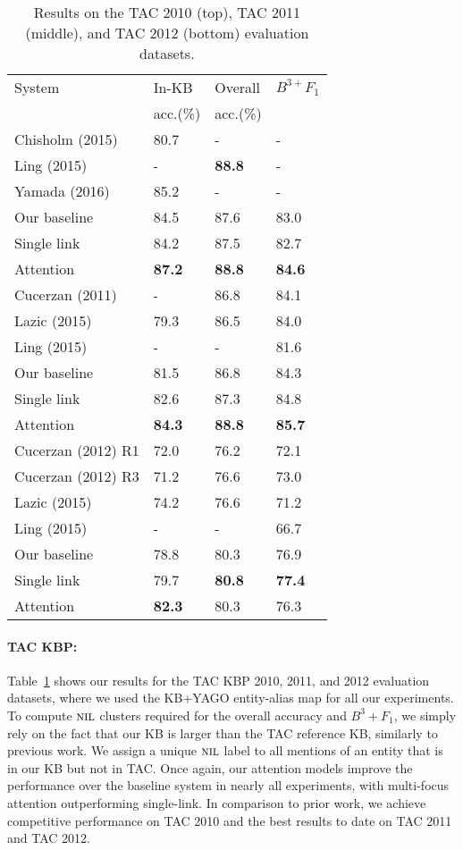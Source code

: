 \begin{table}[t!]
\centering
\begin{tabular}{l|l|l|l}
 System & In-KB & Overall & {\small ${B^{3+}F_1}$} \\ 
 & acc.(\%) & acc.(\%) & \\
\hline
Chisholm (2015) & 80.7& - & - \\
Ling (2015) & - & {\bf 88.8} & - \\
Yamada (2016)&  85.2 & - & - \\
  Our baseline & 84.5 & 87.6 & 83.0 \\
 Single link & 84.2 & 87.5 & 82.7\\
 Attention & {\bf 87.2} & {\bf 88.8} & {\bf 84.6} \\
\hline \hline
Cucerzan (2011) & - & 86.8 &  84.1 \\
Lazic (2015) & 79.3 & 86.5 & 84.0 \\
Ling (2015) &- & - & 81.6 \\
Our baseline & 81.5 & 86.8 & 84.3 \\
Single link & 82.6 & 87.3 & 84.8 \\
 Attention & {\bf 84.3} & {\bf 88.8} & {\bf 85.7} \\
\hline
\hline
Cucerzan (2012) R1 & 72.0 & 76.2 & 72.1  \\
Cucerzan (2012) R3 & 71.2 & 76.6 & 73.0 \\
Lazic (2015) & {74.2} & {76.6} & 71.2 \\
Ling (2015) & - & - & 66.7 \\
Our baseline &78.8 & 80.3 & 76.9\\
 Single link & 79.7 & {\bf 80.8} & {\bf 77.4}  \\
 Attention &{\bf 82.3} & 80.3 & 76.3 \\
\end{tabular}
\caption{Results on the TAC 2010 (top), TAC 2011 (middle), and TAC 2012 (bottom) evaluation datasets. \label{table:tac_results} }
\end{table}

\paragraph*{TAC KBP:}
Table~\ref{table:tac_results} shows our results for the TAC KBP 2010, 2011, and 2012
evaluation datasets, where we used the KB+YAGO entity-alias map for all our experiments. 
To compute $\mbox{\textsc{nil}}$ clusters required for the overall accuracy
and $B^3+F_1$, we simply rely on the fact that our KB is larger than the TAC
reference KB, similarly to previous work. We assign a unique $\mbox{\textsc{nil}}$ label to
all mentions of an entity that is in our KB but not in TAC. 
Once again, our attention models improve the performance over the baseline
system in nearly all experiments, with multi-focus attention outperforming single-link. In comparison to
prior work, we achieve competitive performance on TAC 2010 and the best
results to date on TAC 2011 and TAC 2012.

